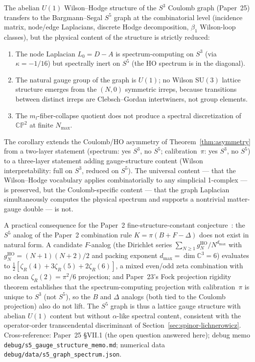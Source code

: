 \documentclass[twocolumn,pra,amsmath,amssymb,superscriptaddress]{revtex4-2}
\begin{document}
\begin{corollary}
\label{cor:gauge-structure-reduction}
The abelian $U(1)$ Wilson--Hodge structure of the $S^3$ Coulomb
graph (Paper~25) transfers to the Bargmann--Segal $S^5$ graph at
the combinatorial level (incidence matrix, node/edge Laplacians,
discrete Hodge decomposition, $\beta_1$ Wilson-loop classes), but
the physical content of the structure is strictly reduced:
\begin{enumerate}
\item The node Laplacian $L_0 = D - A$ is spectrum-computing on
  $S^3$ (via $\kappa = -1/16$) but spectrally inert on $S^5$ (the
  HO spectrum is in the diagonal).
\item The natural gauge group of the graph is $U(1)$; no Wilson
  $\mathrm{SU}(3)$ lattice structure emerges from the $(N, 0)$
  symmetric irreps, because transitions between distinct irreps
  are Clebsch--Gordan intertwiners, not group elements.
\item The $m_l$-fiber-collapse quotient does not produce a
  spectral discretization of $\mathbb{CP}^2$ at finite $N_{\max}$.
\end{enumerate}
\end{corollary}

The corollary extends the Coulomb/HO asymmetry of
Theorem~\ref{thm:asymmetry} from a two-layer statement
(spectrum: yes $S^3$, no $S^5$; calibration~$\pi$: yes $S^3$,
no $S^5$) to a three-layer statement adding gauge-structure
content (Wilson interpretability: full on $S^3$, reduced on $S^5$).
The universal content --- that the Wilson--Hodge vocabulary applies
combinatorially to any simplicial 1-complex --- is preserved, but
the Coulomb-specific content --- that the graph Laplacian
simultaneously computes the physical spectrum and supports a
nontrivial matter-gauge double --- is not.

A practical consequence for the Paper~2 fine-structure-constant
conjecture~\cite{paper2_alpha}: the $S^5$ analog of the Paper~2
combination rule $K = \pi(B + F - \Delta)$ does not exist in
natural form.  A candidate $F$-analog (the Dirichlet series
$\sum_{N\geq 1} g_N^{\mathrm{HO}} / N^{d_{\max}}$ with
$g_N^{\mathrm{HO}} = (N+1)(N+2)/2$ and packing exponent
$d_{\max} = \dim\mathbb{C}^3 = 6$) evaluates to
$\tfrac{1}{2}[\zeta_R(4) + 3\zeta_R(5) + 2\zeta_R(6)]$, a mixed
even/odd zeta combination with no clean $\zeta_R(2) = \pi^2/6$
projection; and Paper~23's Fock projection rigidity theorem
establishes that the spectrum-computing projection with
calibration~$\pi$ is unique to $S^3$ (not $S^5$), so the $B$ and
$\Delta$ analogs (both tied to the Coulomb projection) also do not
lift.  The $S^5$ graph is thus a lattice gauge structure with
abelian $U(1)$ content but without $\alpha$-like spectral content,
consistent with the operator-order transcendental discriminant of
Section~\ref{sec:spinor-lichnerowicz}.  Cross-reference: Paper~25
\S VII.1 (the open question answered here); debug memo
\texttt{debug/s5\_gauge\_structure\_memo.md}; numerical data
\texttt{debug/data/s5\_graph\_spectrum.json}.
\end{document}
